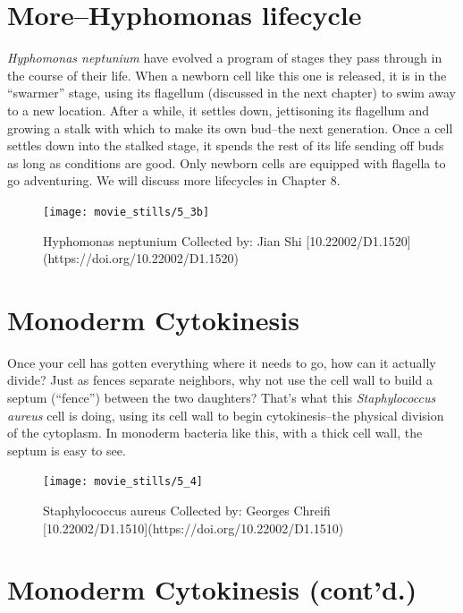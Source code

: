\documentclass[]{tufte-book}
\begin{document}
\hypertarget{morehyphomonas-lifecycle}{\section{More--Hyphomonas
lifecycle}\label{morehyphomonas-lifecycle}}

\emph{Hyphomonas neptunium} have evolved a program of stages they pass
through in the course of their life. When a newborn cell like this one
is released, it is in the ``swarmer'' stage, using its flagellum
(discussed in the next chapter) to swim away to a new location. After a
while, it settles down, jettisoning its flagellum and growing a stalk
with which to make its own bud--the next generation. Once a cell settles
down into the stalked stage, it spends the rest of its life sending off
buds as long as conditions are good. Only newborn cells are equipped
with flagella to go adventuring. We will discuss more lifecycles in
Chapter 8.

\begin{figure}
\texttt{[image: movie\_stills/5\_3b]} \caption[Hyphomonas neptunium Collected by]{Hyphomonas neptunium Collected by: Jian Shi [10.22002/D1.1520](https://doi.org/10.22002/D1.1520)}\label{fig:unnamed-chunk-84}
\end{figure}

\section{Monoderm Cytokinesis}\label{monoderm-cytokinesis}

Once your cell has gotten everything where it needs to go, how can it
actually divide? Just as fences separate neighbors, why not use the cell
wall to build a septum (``fence'') between the two daughters? That's
what this \emph{Staphylococcus aureus} cell is doing, using its cell
wall to begin cytokinesis--the physical division of the cytoplasm. In
monoderm bacteria like this, with a thick cell wall, the septum is easy
to see.

\begin{figure}
\texttt{[image: movie\_stills/5\_4]} \caption[Staphylococcus aureus Collected by]{Staphylococcus aureus Collected by: Georges Chreifi [10.22002/D1.1510](https://doi.org/10.22002/D1.1510)}\label{fig:unnamed-chunk-85}
\end{figure}

\section{Monoderm Cytokinesis
(cont'd.)}\label{monoderm-cytokinesis-contd.}
\end{document}
